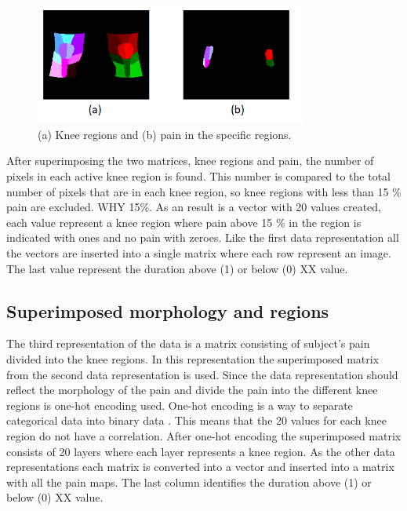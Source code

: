 \begin{figure} [H]
\centering
\includegraphics[width=0.8\textwidth]{figures/binregions}
\caption{(a) Knee regions and (b) pain in the specific regions.}
\label{fig:binregions}
\end{figure}

\noindent
After superimposing the two matrices, knee regions and pain, the number of pixels in each active knee region is found. This number is compared to the total number of pixels that are in each knee region, so knee regions with less than 15 \% pain are excluded. WHY 15\%. As an result is a vector with 20 values created, each value represent a knee region where pain above 15 \% in the region is indicated with ones and no pain with zeroes. 
Like the first data representation all the vectors are inserted into a single matrix where each row represent an image. The last value represent the duration above (1) or below (0) XX value.


\subsection{Superimposed morphology and regions}
The third representation of the data is a matrix consisting of subject's pain divided into the knee regions.
\noindent
In this representation the superimposed matrix from the second data representation is used. Since the data representation should reflect the morphology of the pain and divide the pain into the different knee regions is one-hot encoding used. One-hot encoding is a way to separate categorical data into binary data \citep{Harris2012}. This means that the 20 values for each knee region do not have a correlation. After one-hot encoding the superimposed matrix consists of 20 layers where each layer represents a knee region.
As the other data representations each matrix is converted into a vector and inserted into a matrix with all the pain maps. The last column identifies the duration above (1) or below (0) XX value. 
